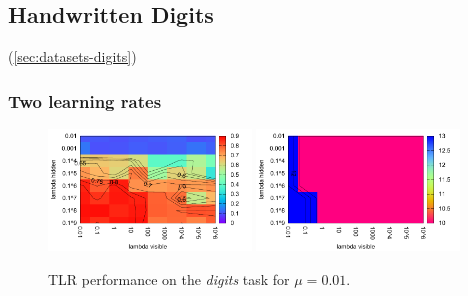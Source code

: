 

\subsection{Handwritten Digits} 
\label{sec:results-digits} 

(\ref{sec:datasets-digits}) 

\subsubsection{Two learning rates} 
\label{sec:tlr-digits} 

\begin{figure}[H]
  \centering
  \includegraphics[width=0.48\textwidth]{img/tlr-digits-psf.pdf} 
  \includegraphics[width=0.48\textwidth]{img/tlr-digits-epoch.pdf}     
  \caption{TLR performance on the \emph{digits} task for $\mu = 0.01$.}
  \label{fig:results-tlr-digits-success}
\end{figure}

